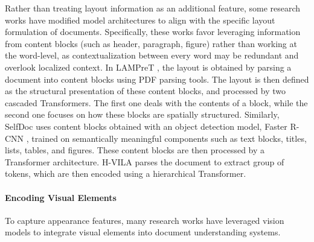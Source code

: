 Rather than treating layout information as an additional feature, some research works have modified model architectures to align with the specific layout formulation of documents. Specifically, these works favor leveraging information from content blocks (such as header, paragraph, figure) rather than working at the word-level, as contextualization between every word may be redundant and overlook localized context. In \ac{LAMPreT} \citep{wu2021lampret}, the layout is obtained by parsing a document into content blocks using PDF parsing tools. The layout is then defined as the structural presentation of these content blocks, and processed by two cascaded Transformers. The first one deals with the contents of a block, while the second one focuses on how these blocks are spatially structured. Similarly, SelfDoc \citep{li2021selfdoc} uses content blocks obtained with an object detection model, Faster R-CNN \citep{ren2015faster}, trained on semantically meaningful components such as text blocks, titles, lists, tables, and figures. These content blocks are then processed by a Transformer architecture. H-VILA \citep{shen2022vila} parses the document to extract group of tokens, which are then encoded using a hierarchical Transformer.


\paragraph{Encoding Visual Elements} 

To capture appearance features, many research works have leveraged vision models to integrate visual elements into document understanding systems.


